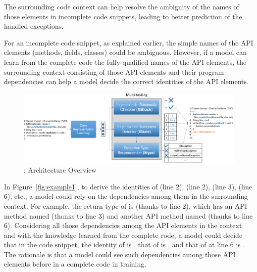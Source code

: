 \begin{Observation} 
\label{ob4}
The surrounding code context can help resolve the ambiguity of the
names of those elements in incomplete code snippets, leading to
better prediction of the handled exceptions.
\end{Observation}

For an incomplete code snippet, as explained earlier, the simple names
of the API elements (methods, fields, classes) could be ambiguous.
However, if a model can learn from the complete code the
fully-qualified names of the API elements, the surrounding context
consisting of those API elements and their program dependencies can
help a model decide the correct identities of the API elements.




\begin{figure}[htp]
\begin{center}
\includegraphics[width=5.6in]{overview-3.png}
\vspace{-10pt}
\caption{{\tool}: Architecture Overview}
\label{overview}
\end{center}
\end{figure}

In Figure~\ref{fig:example1}, to derive the identities of
 (line 2),  (line 2),
 (line 3),  (line 6), etc., a model
could rely on the dependencies among them in the surrounding context.
For example, the return type of  is
 (thanks to line 2), which has an API method named
 (thanks to line 3) and another API method named
 (thanks to line 6). Considering all those dependencies among
the API elements in the context and with the knowledge learned from
the complete code, a model could decide that in the code snippet, the identity of
 is , that of
 is
, and that of 
 at line 6 is
. The rationale is that a
model could see such dependencies among those API elements before in
a complete code in training.





